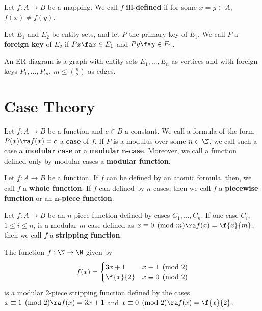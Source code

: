 \documentclass[12pt]{article}
\begin{document}
    \begin{definition}
        Let $f:A \to B$ be a mapping. We call $f$ \textbf{ill-defined} if for some $x = y \in A$, $f(x) \neq f(y)$. 
    \end{definition}

    \begin{definition}
        Let $E_1$ and $E_2$ be entity sets, and let $P$ the primary key of $E_1$. We call $P$ a \textbf{foreign key} of $E_2$ if $Px \fa x \in E_1$ and $Py \fa y \in E_2$. 
    \end{definition}


    \begin{definition}
        An ER-diagram is a graph with entity sets $E_1,\dots,E_n$ as vertices and with foreign keys $P_1,\dots,P_m$, $m \le \binom{n}{2}$ as edges. 
    \end{definition}

    \section{Case Theory}
    \begin{definition}
        Let $f:A \to B$ be a function and $c \in B$ a constant. We call a formula of the form $P(x) \ra f(x) = c$ a \textbf{case} of $f$. If $P$ is a modulus over some $n \in \N$, we call such a case a \textbf{modular case} or a \textbf{modular} $\mathbf{n}$\textbf{-case}. Moreover, we call a function defined only by modular cases a \textbf{modular function}. 
    \end{definition}

    \begin{definition}
        Let $f:A \to B$ be a function. If $f$ can be defined by an atomic formula, then, we call $f$ a \textbf{whole function}. If $f$ can defined by $n$ cases, then we call $f$ a \textbf{piecewise function} or an $\mathbf{n}$\textbf{-piece function}. 
    \end{definition}

    \begin{definition}
        Let $f:A \to B$ be an $n$-piece function defined by cases $C_1,\dots,C_n$. If one case $C_i$, $1 \le i \le n$, is a modular $m$-case defined as $x \equiv 0 \pmod m \ra f(x) = \f{x}{m}$, then we call $f$ a \textbf{stripping function}. 
    \end{definition}

    \begin{example}
        The function $f:\N \to \N$ given by 
        \[
            f(x) = 
            \begin{cases}
                3x + 1 & x \equiv 1 \pmod 2 \\
                \f{x}{2} & x \equiv 0 \pmod 2
            \end{cases}
        \]
        is a modular 2-piece stripping function defined by the cases $x \equiv 1 \pmod 2 \ra f(x) = 3x + 1$ and $x \equiv 0 \pmod 2 \ra f(x) = \f{x}{2}$. 
    \end{example}
\end{document}
